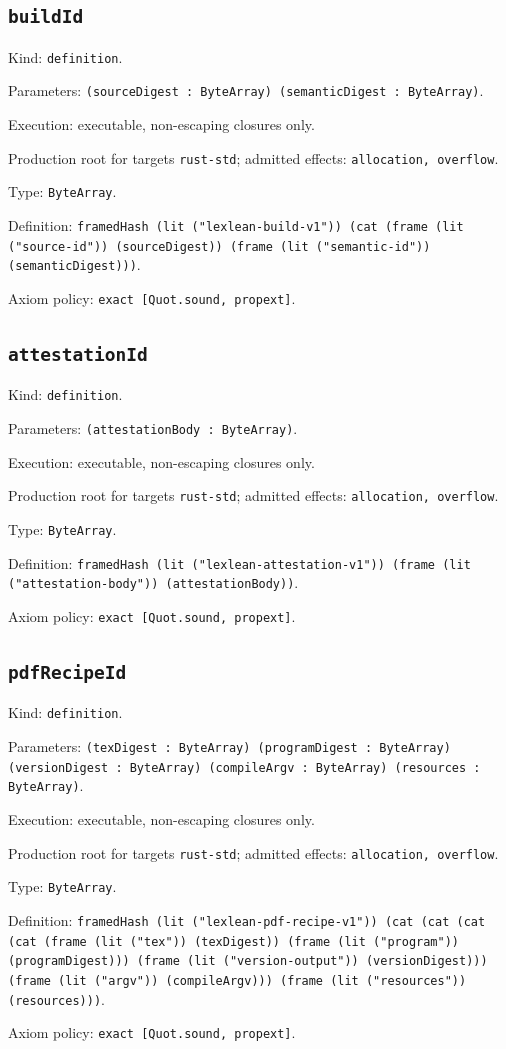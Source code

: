 \documentclass[11pt]{article}
\begin{document}
\subsection*{\texttt{buildId}}
\noindent Kind: \texttt{definition}.\par
\noindent Parameters: \texttt{(sourceDigest : ByteArray) (semanticDigest : ByteArray)}.\par
\noindent Execution: executable, non-escaping closures only.\par
\noindent Production root for targets \texttt{rust-std}; admitted effects: \texttt{allocation, overflow}.\par
\noindent Type: \texttt{ByteArray}.\par
\noindent Definition: \texttt{framedHash (lit ("lexlean-build-v1")) (cat (frame (lit ("source-id")) (sourceDigest)) (frame (lit ("semantic-id")) (semanticDigest)))}.\par
\noindent Axiom policy: \texttt{exact [Quot.sound, propext]}.\par
\subsection*{\texttt{attestationId}}
\noindent Kind: \texttt{definition}.\par
\noindent Parameters: \texttt{(attestationBody : ByteArray)}.\par
\noindent Execution: executable, non-escaping closures only.\par
\noindent Production root for targets \texttt{rust-std}; admitted effects: \texttt{allocation, overflow}.\par
\noindent Type: \texttt{ByteArray}.\par
\noindent Definition: \texttt{framedHash (lit ("lexlean-attestation-v1")) (frame (lit ("attestation-body")) (attestationBody))}.\par
\noindent Axiom policy: \texttt{exact [Quot.sound, propext]}.\par
\subsection*{\texttt{pdfRecipeId}}
\noindent Kind: \texttt{definition}.\par
\noindent Parameters: \texttt{(texDigest : ByteArray) (programDigest : ByteArray) (versionDigest : ByteArray) (compileArgv : ByteArray) (resources : ByteArray)}.\par
\noindent Execution: executable, non-escaping closures only.\par
\noindent Production root for targets \texttt{rust-std}; admitted effects: \texttt{allocation, overflow}.\par
\noindent Type: \texttt{ByteArray}.\par
\noindent Definition: \texttt{framedHash (lit ("lexlean-pdf-recipe-v1")) (cat (cat (cat (cat (frame (lit ("tex")) (texDigest)) (frame (lit ("program")) (programDigest))) (frame (lit ("version-output")) (versionDigest))) (frame (lit ("argv")) (compileArgv))) (frame (lit ("resources")) (resources)))}.\par
\noindent Axiom policy: \texttt{exact [Quot.sound, propext]}.\par
\end{document}
